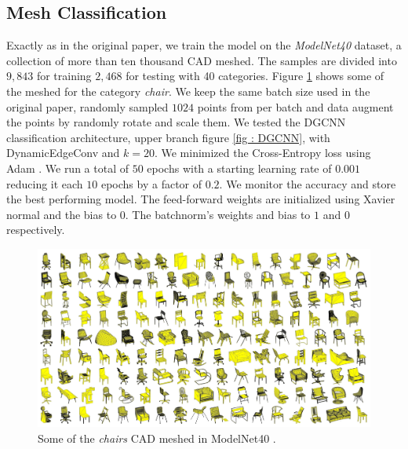 \documentclass[twocolumn,showpacs,
  nofootinbib,aps,superscriptaddress,
  eqsecnum,prd,notitlepage,showkeys,10pt]{revtex4-1}
\begin{document}
\subsection{Mesh Classification}
Exactly as in the original paper, we train the model on the \emph{ModelNet40} dataset, a collection of more than ten thousand CAD meshed. The samples are divided into $9,843$ for training $2,468$ for testing with 40 categories. Figure \ref{fig : modelnet} shows some of the meshed for the category \emph{chair}.  We keep the same batch size used in the original paper, randomly sampled $1024$ points from per batch and data augment the points by randomly rotate and scale them.  
We tested the DGCNN classification architecture, upper branch figure \ref{fig : DGCNN}, with DynamicEdgeConv and $k=20$. We minimized the Cross-Entropy loss using Adam \cite{adam}. We run a total of $50$ epochs with a starting learning rate of $0.001$ reducing it each $10$ epochs by a factor of $0.2$. We monitor the accuracy and store the best performing model. The feed-forward weights are initialized using Xavier normal \cite{xavier}  and the bias to $0$. The batchnorm's \cite{ioffe2015batch} weights and bias to $1$ and $0$ respectively. 
\begin{figure}[H]
  \centering
  \includegraphics[width=\linewidth]{images/ModelNet.jpg}
\caption{Some of the \emph{chairs} CAD meshed in ModelNet40 \cite{shapenet}.}
\label{fig : modelnet}
\end{figure}
\end{document}
